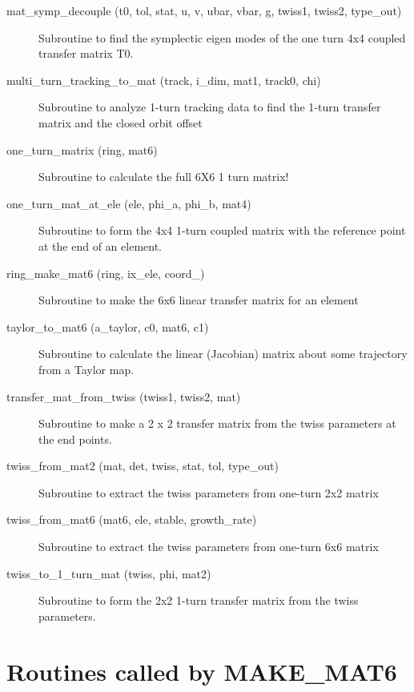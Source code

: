\begin{description}
\item[mat\_symp\_decouple (t0, tol, stat, u, v, ubar, vbar, g, twiss1, twiss2, type\_out)] \Newline
Subroutine to find the symplectic eigen modes of the one turn 4x4 coupled 
transfer matrix T0. 

\item[multi\_turn\_tracking\_to\_mat (track, i\_dim, mat1, track0, chi)] \Newline
Subroutine to analyze 1-turn tracking data to find the 1-turn transfer matrix 
and the closed orbit offset 

\item[one\_turn\_matrix (ring, mat6)] \Newline
Subroutine to calculate the full 6X6 1 turn matrix! 

\item[one\_turn\_mat\_at\_ele (ele, phi\_a, phi\_b, mat4)] \Newline
Subroutine to form the 4x4 1-turn coupled matrix with the reference point 
at the end of an element. 

\item[ring\_make\_mat6 (ring, ix\_ele, coord\_)] \Newline
Subroutine to make the 6x6 linear transfer matrix for an element 

\item[taylor\_to\_mat6 (a\_taylor, c0, mat6, c1)] \Newline
Subroutine to calculate the linear (Jacobian) matrix about some trajectory from a Taylor map. 

\item[transfer\_mat\_from\_twiss (twiss1, twiss2, mat)] \Newline
Subroutine to make a 2 x 2 transfer matrix from the twiss parameters at the end points. 

\item[twiss\_from\_mat2 (mat, det, twiss, stat, tol, type\_out)] \Newline
Subroutine to extract the twiss parameters from one-turn 2x2 matrix 

\item[twiss\_from\_mat6 (mat6, ele, stable, growth\_rate)] \Newline
Subroutine to extract the twiss parameters from one-turn 6x6 matrix 

\item[twiss\_to\_1\_turn\_mat (twiss, phi, mat2)] \Newline
Subroutine to form the 2x2 1-turn transfer matrix from the twiss parameters. 

\end{description}

\section{Routines called by MAKE\_MAT6}
\label{r:mat6}

